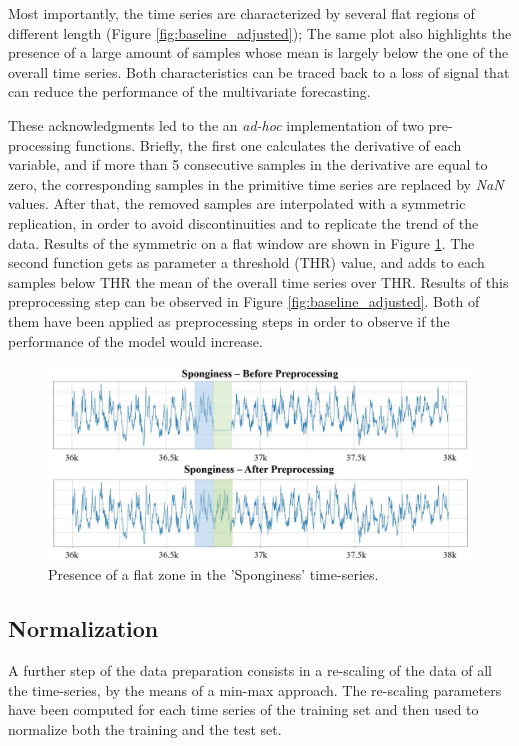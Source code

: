 \documentclass[conference]{IEEEtran}
\begin{document}
    Most importantly, the time series are characterized by several flat regions of different length (Figure \ref{fig:baseline_adjusted});
    The same plot also highlights the presence of a large amount of samples whose mean is largely below the one of the overall time series.
    Both characteristics can be traced back to a loss of signal that can reduce the performance of the multivariate forecasting.
    
    These acknowledgments led to the an \textit{ad-hoc} implementation of two pre-processing functions. Briefly, the first one calculates the derivative of each variable, and if more than 5 consecutive samples in the  derivative are equal to zero, 
    the corresponding samples in the primitive time series are replaced by \textit{NaN} values. After that, the removed samples are interpolated with a symmetric replication, in order to avoid discontinuities and to replicate the trend of the data. Results of the symmetric on a flat window are shown in Figure \ref{fig:reflection_nan}.
    The second function gets as parameter a threshold (THR) value, and adds to each samples below THR the mean of the overall time series over THR. Results of this preprocessing step can be observed in Figure \ref{fig:baseline_adjusted}.
    Both of them have been applied as preprocessing steps in order to observe if the performance of the model would increase. 
    
   \begin{figure}[h]
        \includegraphics[width=\linewidth]{reflection_nan.png}
        \caption{Presence of a flat zone in the 'Sponginess' time-series.}
        \label{fig:reflection_nan}
    \end{figure}

\subsection{Normalization}
    A further step of the data preparation consists in a re-scaling of the data of all the time-series, by the means of a min-max approach. The re-scaling parameters have been computed for each time series of the training set and then used to normalize both the training and the test set. 
    
\end{document}
